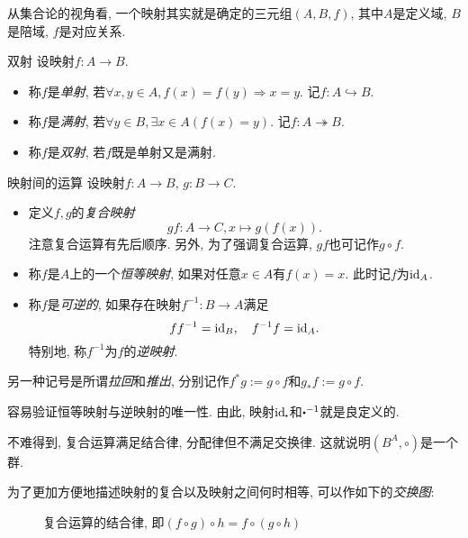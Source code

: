从集合论的视角看, 一个映射其实就是确定的三元组$(A, B, f)$, 其中$A$是定义域, $B$是陪域, $f$是对应关系.

\begin{definition}{双射}
	设映射$f: A \to B$.
	\begin{itemize}
		\item 称$f$是\textit{单射}, 若$\forall x,y \in A, f(x)=f(y) \Rightarrow x=y$. 记$f:A \hookrightarrow B$. 
		\item 称$f$是\textit{满射}, 若$\forall y \in B, \exists x \in A(f(x)=y)$. 记$f: A \twoheadrightarrow B$. 
		\item 称$f$是\textit{双射}, 若$f$既是单射又是满射. 
	\end{itemize}
\end{definition}

\begin{definition}{映射间的运算}
	设映射$f: A \to B$, $g: B \to C$. 
	\begin{itemize}
		\item 定义$f,g$的\textit{复合映射}$$gf: A \to C, x \mapsto g(f(x)).$$
    注意复合运算有先后顺序. 另外, 为了强调复合运算, $gf$也可记作$g \circ f$.
    	\item 称$f$是$A$上的一个\textit{恒等映射}, 如果对任意$x \in A$有$f(x)=x$. 此时记$f$为$\mathrm{id} _A$. 
    	\item 称$f$是\textit{可逆的}, 如果存在映射$f^{-1}: B \to A$满足$$ff^{-1}=\mathrm{id} _B, \quad f^{-1}f=\mathrm{id} _A.$$
	特别地, 称$f^{-1}$为$f$的\textit{逆映射}. 
	\end{itemize}
\end{definition}
\begin{remark}
	另一种记号是所谓\textit{拉回}和\textit{推出}, 分别记作$f^*g:=g \circ f$和$g_*f:=g \circ f$. 
\end{remark}

容易验证恒等映射与逆映射的唯一性. 由此, 映射$\id _{\bigcdot}$和$\bigcdot ^{-1}$就是良定义的. 

不难得到, 复合运算满足结合律, 分配律但不满足交换律. 这就说明$(B^{A},\circ)$是一个群. 

为了更加方便地描述映射的复合以及映射之间何时相等, 可以作如下的\textit{交换图}: 

\begin{figure}[h!]
	\centering
	\caption{复合运算的结合律, 即$(f \circ g) \circ h = f \circ (g \circ h )$}
\end{figure}

